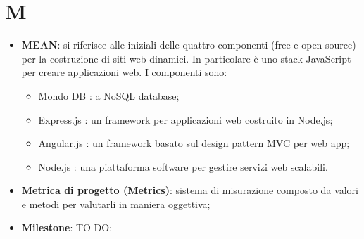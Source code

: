 %
%
%
%
%

\section{M}

\begin{itemize}
	\item \textbf{MEAN}: si riferisce alle iniziali delle quattro componenti (free e open source) per la costruzione di siti web dinamici. \newline
In particolare è uno stack JavaScript per creare applicazioni web. \newline
I componenti sono:
	\begin{itemize}
		\item Mondo DB : a NoSQL database;
		\item Express.js : un framework per applicazioni web costruito in Node.js;
		\item Angular.js : un framework basato sul design pattern MVC per web app;
		\item Node.js : una piattaforma software per gestire servizi web scalabili.
	\end{itemize}

	\item \textbf{Metrica di progetto (Metrics)}: sistema di misurazione composto da valori e metodi per valutarli in maniera oggettiva; 
	
	\item \textbf{Milestone}: TO DO;


\end{itemize}
